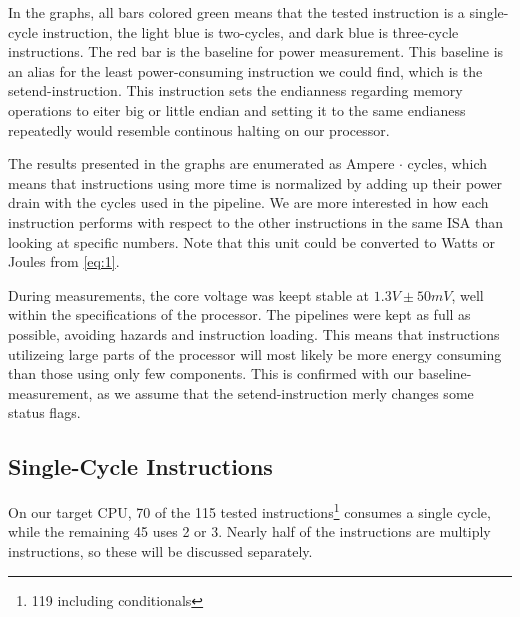 In the graphs, all bars colored green means that the tested instruction is a
single-cycle instruction, the light blue is two-cycles, and dark blue is
three-cycle instructions. The red bar is the baseline for power measurement.
This baseline is an alias for the least power-consuming instruction we could
find, which is the {\ttfamily setend}-instruction. This instruction sets the
endianness regarding memory operations to eiter big or little
endian \cite{armcompilerref} and setting it to the same endianess repeatedly
would resemble continous halting on our processor.

The results presented in the graphs are enumerated as Ampere $\cdot$ cycles,
which means that instructions using more time is normalized by adding up their
power drain with the cycles used in the pipeline. We are more interested in how
each instruction performs with respect to the other instructions in the same ISA
than looking at specific numbers. Note that this unit could be converted to
Watts or Joules from \autoref{eq:1}.

During measurements, the core voltage was keept stable at $1.3V\pm50mV$, well
within the specifications of the processor. The pipelines were kept as full as
possible, avoiding hazards and instruction loading. This means that instructions
utilizeing large parts of the processor will most likely be more energy
consuming than those using only few components. This is confirmed with our
{\ttfamily baseline}-measurement, as we assume that the {\ttfamily
setend}-instruction merly changes some status flags.




\subsection{Single-Cycle Instructions}
On our target CPU, 70 of the 115 tested instructions\footnote{119 including
conditionals} consumes a single cycle, while the remaining 45 uses 2 or 3.
Nearly half of the instructions are multiply instructions, so these will be
discussed separately.

